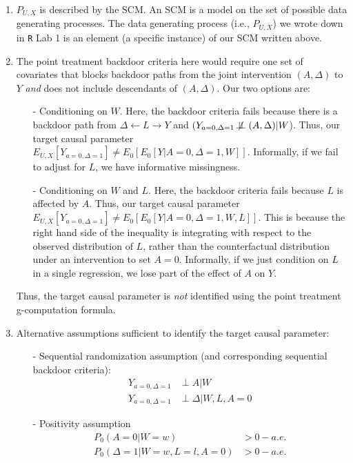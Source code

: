 \documentclass[answers]{exam}
\begin{document}
\begin{solution}
\begin{enumerate}
\item $P_{U,X}$ is described by the SCM. An SCM is a model on the set of possible data generating processes. The data generating process (i.e., $P_{U,X}$) we wrote down in \texttt{R} Lab 1 is an element (a specific instance) of our SCM written above.

\item The point treatment backdoor criteria here would require one set of covariates that blocks backdoor paths from the joint intervention $(A, \Delta)$ to $Y$ \textit{and} does not include descendants of $(A, \Delta)$. Our two options are:

\begin{itemize}
\item[-] Conditioning on $W$. Here, the backdoor criteria fails because there is a backdoor path from $\Delta \leftarrow L \rightarrow Y$ and $(Y_{a=0, \Delta =1} \not\!\perp\!\!\!\perp (A, \Delta) | W$). Thus, our target causal parameter $E_{U,X}[Y_{a=0, \Delta = 1}] \neq E_0[E_0[Y|A = 0, \Delta = 1, W]]$. Informally, if we fail to adjust for $L$, we have informative missingness.
\item[-] Conditioning on $W$ and $L$. Here, the backdoor criteria fails because $L$ is affected by $A$. Thus, our target causal parameter $E_{U,X}[Y_{a=0, \Delta = 1}] \neq E_0[E_0[Y|A=0,\Delta=1,W,L]]$. This is because the right hand side of the inequality is integrating with respect to the observed distribution of $L$, rather than the counterfactual distribution under an intervention to set $A=0$. Informally, if we just condition on $L$ in a single regression, we lose part of the effect of $A$ on $Y$.
\end{itemize}

Thus, the target causal parameter is \textit{not} identified using the point treatment g-computation formula.

\item Alternative assumptions sufficient to identify the target causal parameter:

\begin{itemize}
\item[-] Sequential randomization assumption (and corresponding sequential backdoor criteria): 
\begin{align*}
Y_{a=0,\Delta = 1} & \perp A|W \\
Y_{a=0, \Delta = 1} & \perp \Delta | W, L, A=0
\end{align*}
\item[-] Positivity assumption
\begin{align*}
P_0(A = 0|W = w) & > 0 - a.e.\\
P_0(\Delta = 1 | W = w, L = l, A = 0) & > 0 - a.e. \\
\end{align*}
\end{itemize}


\end{enumerate}
\end{solution}
\end{document}

